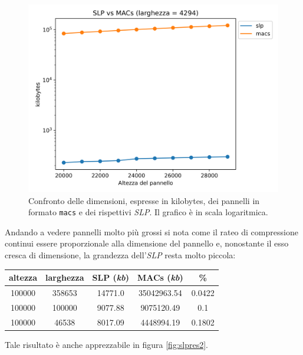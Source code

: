 \begin{figure}
  \centering
  \includegraphics[scale = 0.6]{img/slp_vs_macs.png}
  \caption{Confronto delle dimensioni, espresse in kilobytes, dei pannelli in
    formato \texttt{macs} e dei rispettivi \textit{SLP}. Il grafico è in scala
    logaritmica.}
  \label{fig:slpres1}
\end{figure}
Andando a vedere pannelli molto più grossi si nota come il rateo di
compressione continui essere proporzionale alla dimensione del pannello e,
nonostante il esso cresca di 
dimensione, la grandezza dell'\textit{SLP} resta molto piccola:
\begin{table}[H]
  \centering
  \begin{tabular}{c|c|c|c|c}
    \textbf{altezza} & \textbf{larghezza} & \textbf{SLP (\textit{kb})}
    & \textbf{MACs (\textit{kb})} & \textbf{\%}\\
    \hline
    100000 & 358653 & 14771.0 & 35042963.54 & 0.0422\\
    100000 & 100000 & 9077.88 & 9075120.49 & 0.1\\
    100000 & 46538 & 8017.09 & 4448994.19 & 0.1802\\
  \end{tabular}
\end{table}
Tale risultato è anche apprezzabile in figura \ref{fig:slpres2}.
